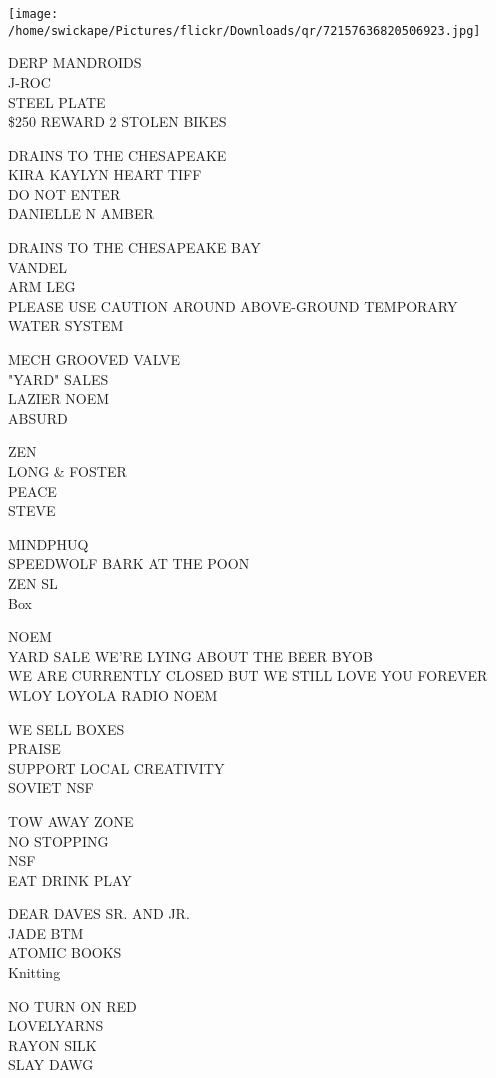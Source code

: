 \documentclass[10pt,letterpaper]{article}
\begin{document}
\texttt{[image: /home/swickape/Pictures/flickr/Downloads/qr/72157636820506923.jpg]}


DERP MANDROIDS\\
J{-}ROC\\
STEEL PLATE\\
\$250 REWARD 2 STOLEN BIKES

DRAINS TO THE CHESAPEAKE\\
KIRA KAYLYN HEART TIFF\\
DO NOT ENTER\\
DANIELLE N AMBER

DRAINS TO THE CHESAPEAKE BAY\\
VANDEL\\
ARM LEG\\
PLEASE USE CAUTION AROUND ABOVE{-}GROUND TEMPORARY WATER SYSTEM

MECH GROOVED VALVE\\
"YARD" SALES\\
LAZIER NOEM\\
ABSURD

ZEN\\
LONG \& FOSTER\\
PEACE\\
STEVE

MINDPHUQ\\
SPEEDWOLF BARK AT THE POON\\
ZEN SL\\
Box

NOEM\\
YARD SALE WE'RE LYING ABOUT THE BEER BYOB\\
WE ARE CURRENTLY CLOSED BUT WE STILL LOVE YOU FOREVER\\
WLOY LOYOLA RADIO NOEM

WE SELL BOXES\\
PRAISE\\
SUPPORT LOCAL CREATIVITY\\
SOVIET NSF

TOW AWAY ZONE\\
NO STOPPING\\
NSF\\
EAT DRINK PLAY

DEAR DAVES SR. AND JR.\\
JADE BTM\\
ATOMIC BOOKS\\
Knitting

NO TURN ON RED\\
LOVELYARNS\\
RAYON SILK\\
SLAY DAWG
\end{document}
